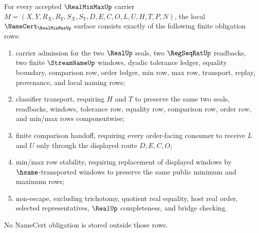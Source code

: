 \begin{theorem}
\label{thm:real-min-max-namecert-obligations}
For every accepted $\RealMinMaxUp$ carrier $M=(X,Y,R_X,R_Y,S_X,S_Y,D,E,C,O,L,U,H,T,P,N)$, the local $\NameCert_{\RealMinMaxUp}$ surface consists exactly of the following finite obligation rows:
\begin{enumerate}
\item carrier admission for the two $\RealUp$ seals, two $\RegSeqRatUp$ readbacks, two finite $\StreamNameUp$ windows, dyadic tolerance ledger, equality boundary, comparison row, order ledger, min row, max row, transport, replay, provenance, and local naming rows;
\item classifier transport, requiring $H$ and $T$ to preserve the same two seals, readbacks, windows, tolerance row, equality row, comparison row, order row, and min/max rows componentwise;
\item finite comparison handoff, requiring every order-facing consumer to receive $L$ and $U$ only through the displayed route $D,E,C,O$;
\item min/max row stability, requiring replacement of displayed windows by $\hsame$-transported windows to preserve the same public minimum and maximum rows;
\item non-escape, excluding trichotomy, quotient real equality, host real order, selected representatives, $\RealUp$ completeness, and bridge checking.
\end{enumerate}
No NameCert obligation is stored outside those rows.
\end{theorem}
